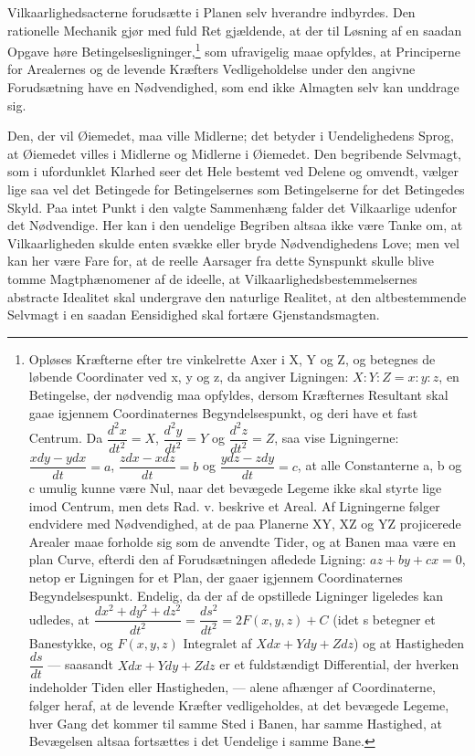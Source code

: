 \documentclass[12pt,a4paper]{book}
\begin{document}
Vilkaarlighedsacterne forudsætte i Planen selv hverandre indbyrdes.
Den rationelle Mechanik gjør med fuld Ret gjældende, at der til Løsning
af en saadan Opgave høre
Betingelsesligninger,\footnote{%
Opløses Kræfterne efter tre vinkelrette Axer i X, Y og Z, og betegnes de
løbende Coordinater ved x, y og z, da angiver Ligningen: $X : Y : Z = x :
y : z$, en Betingelse, der nødvendig maa opfyldes, dersom Kræfternes
Resultant skal gaae igjennem Coordinaternes Begyndelsespunkt, og deri
have et fast Centrum. Da $\dfrac{d^2x}{dt^2} = X$,
$\dfrac{d^2y}{dt^2} = Y$ og $\dfrac{d^2z}{dt^2} = Z$, saa vise
Ligningerne: $\dfrac{xdy - ydx}{dt} = a$, $\dfrac{zdx - xdz}{dt} = b$
og $\dfrac{ydz - zdy}{dt} = c$, at alle Constanterne a, b og c umulig
kunne være Nul, naar det bevægede Legeme ikke skal styrte lige imod
Centrum, men dets Rad. v. beskrive et Areal. Af Ligningerne følger
endvidere med Nødvendighed, at de paa Planerne XY, XZ og YZ projicerede
Arealer maae forholde sig som de anvendte Tider, og at Banen maa være en
plan Curve, efterdi den af Forudsætningen afledede Ligning:
$az + by + cx = 0$, netop er Ligningen for et Plan, der gaaer igjennem
Coordinaternes Begyndelsespunkt. Endelig, da der af de opstillede
Ligninger ligeledes kan udledes, at
$\dfrac{dx^2 + dy^2 + dz^2}{dt^2} = \dfrac{ds^2}{dt^2} = 2F(x, y, z) + C$
(idet s betegner et Banestykke, og $F(x, y, z)$ Integralet af
$Xdx + Ydy + Zdz$) og at Hastigheden $\dfrac{ds}{dt}$ --- saasandt
$Xdx + Ydy + Zdz$ er et fuldstændigt Differential, der hverken
indeholder Tiden eller Hastigheden, --- alene afhænger af
Coordinaterne, følger heraf, at de levende Kræfter vedligeholdes, at det
bevægede Legeme, hver Gang det kommer til samme Sted i Banen, har samme
Hastighed, at Bevægelsen altsaa fortsættes i det Uendelige i samme
Bane.} som ufravigelig maae opfyldes, at
Principerne for Arealernes og de levende Kræfters Vedligeholdelse under
den angivne Forudsætning have en Nødvendighed, som end ikke Almagten
selv kan unddrage sig.

Den, der vil Øiemedet, maa ville Midlerne; det betyder i
Uendelighedens Sprog, at Øiemedet villes i Midlerne og Midlerne i
Øiemedet. Den begribende Selvmagt, som i ufordunklet Klarhed seer det
Hele bestemt ved Delene og omvendt, vælger lige saa vel det Betingede
for Betingelsernes som Betingelserne for det Betingedes Skyld. Paa
intet Punkt i den valgte Sammenhæng falder det Vilkaarlige udenfor det
Nødvendige. Her kan i den uendelige Begriben altsaa ikke være Tanke om,
at Vilkaarligheden skulde enten svække eller bryde Nødvendighedens
Love; men vel kan her være Fare for, at de reelle Aarsager fra dette
Synspunkt skulle blive tomme Magtphænomener af de ideelle, at
Vilkaarlighedsbestemmelsernes abstracte Idealitet skal undergrave den
naturlige Realitet, at den altbestemmende Selvmagt i en saadan
Eensidighed skal fortære Gjenstandsmagten.
\end{document}
